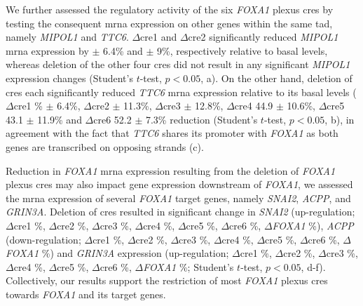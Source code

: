 We further assessed the regulatory activity of the six \emph{FOXA1} plexus \glspl{cre} by testing the consequent \gls{mrna} expression on other genes within the same \gls{tad}, namely \emph{MIPOL1} and \emph{TTC6}.
$\Delta$\gls{cre}1 and $\Delta$\gls{cre}2 significantly reduced \emph{MIPOL1} \gls{mrna} expression by  $\pm$ 6.4\% and  $\pm$ 9\%, respectively relative to basal levels, whereas deletion of the other four \glspl{cre} did not result in any significant \emph{MIPOL1} expression changes (Student's $t$-test, $p<0.05$, a).
On the other hand, deletion of \glspl{cre} each significantly reduced \emph{TTC6} \gls{mrna} expression relative to its basal levels ($\Delta$\gls{cre}1 \% $\pm$ 6.4\%, $\Delta$\gls{cre}2  $\pm$ 11.3\%, $\Delta$\gls{cre}3  $\pm$ 12.8\%, $\Delta$\gls{cre}4 44.9 $\pm$ 10.6\%, $\Delta$\gls{cre}5 43.1 $\pm$ 11.9\% and $\Delta$\gls{cre}6 52.2 $\pm$ 7.3\% reduction (Student's $t$-test, $p<0.05$, b), in agreement with the fact that \emph{TTC6} shares its promoter with \emph{FOXA1} as both genes are transcribed on opposing strands (c).

Reduction in \emph{FOXA1} \gls{mrna} expression resulting from the deletion of \emph{FOXA1} plexus \glspl{cre} may also impact gene expression downstream of \emph{FOXA1}, we assessed the \gls{mrna} expression of several \emph{FOXA1} target genes, namely \emph{SNAI2}, \emph{ACPP}, and \emph{GRIN3A}.
Deletion of \glspl{cre} resulted in significant change in \emph{SNAI2} (up-regulation; $\Delta$\gls{cre}1 \%, $\Delta$\gls{cre}2 \%, $\Delta$\gls{cre}3 \%, $\Delta$\gls{cre}4 \%, $\Delta$\gls{cre}5 \%, $\Delta$\gls{cre}6 \%, $\Delta$\emph{FOXA1} \%), \emph{ACPP} (down-regulation; $\Delta$\gls{cre}1 \%, $\Delta$\gls{cre}2 \%, $\Delta$\gls{cre}3 \%, $\Delta$\gls{cre}4 \%, $\Delta$\gls{cre}5 \%, $\Delta$\gls{cre}6 \%, $\Delta$\emph{FOXA1} \%) and \emph{GRIN3A} expression (up-regulation; $\Delta$\gls{cre}1 \%, $\Delta$\gls{cre}2 \%, $\Delta$\gls{cre}3 \%, $\Delta$\gls{cre}4 \%, $\Delta$\gls{cre}5 \%, $\Delta$\gls{cre}6 \%, $\Delta$\emph{FOXA1} \%; Student's $t$-test, $p < 0.05$, d-f).
Collectively, our results support the restriction of most \emph{FOXA1} plexus \glspl{cre} towards \emph{FOXA1} and its target genes.

